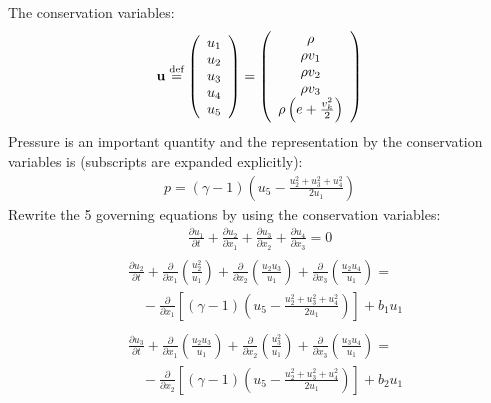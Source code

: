 \documentclass{turgon}
\begin{document}
The conservation variables:
%
\begin{align}
  \mathbf{u} \defeq \left(
  \begin{array}{c}
    u_1 \\ u_2 \\ u_3 \\ u_4 \\ u_5
  \end{array}\right) = \left(
  \begin{array}{c}
    \rho \\ \rho v_1 \\ \rho v_2 \\ \rho v_3 \\
    \rho\left(e+\frac{v_k^2}{2}\right)
  \end{array}\right)
  \label{e:euler:unknown}
\end{align}
%
Pressure is an important quantity and the representation by the conservation
variables is (subscripts are expanded explicitly):
\begin{align*}
  p = (\gamma-1)\left(u_5 - \frac{u_2^2+u_3^2+u_4^2}{2u_1}\right)
\end{align*}
%
Rewrite the 5 governing equations by using the conservation variables:
%
\begin{align}
  \frac{\partial u_1}{\partial t}
  + \frac{\partial u_2}{\partial x_1}
  + \frac{\partial u_3}{\partial x_2}
  + \frac{\partial u_4}{\partial x_3} = 0
  \label{e:euler:gov1}
\end{align}
%
\begin{align}
  \begin{aligned} &\frac{\partial u_2}{\partial t}
  + \frac{\partial}{\partial x_1}\left(\frac{u_2^2}{u_1}\right)
  + \frac{\partial}{\partial x_2}\left(\frac{u_2u_3}{u_1}\right)
  + \frac{\partial}{\partial x_3}\left(\frac{u_2u_4}{u_1}\right) = \\
  &\quad -\frac{\partial}{\partial x_1}\left[
    (\gamma-1)\left(u_5 - \frac{u_2^2+u_3^2+u_4^2}{2u_1}\right)
    \right] + b_1u_1
  \end{aligned}
  \label{e:euler:gov2}
\end{align}
%
\begin{align}
  \begin{aligned} &\frac{\partial u_3}{\partial t}
  + \frac{\partial}{\partial x_1}\left(\frac{u_2u_3}{u_1}\right)
  + \frac{\partial}{\partial x_2}\left(\frac{u_3^2}{u_1}\right)
  + \frac{\partial}{\partial x_3}\left(\frac{u_3u_4}{u_1}\right) = \\
  &\quad -\frac{\partial}{\partial x_2}\left[
    (\gamma-1)\left(u_5 - \frac{u_2^2+u_3^2+u_4^2}{2u_1}\right)
    \right] + b_2u_1
  \end{aligned}
  \label{e:euler:gov3}
\end{align}
\end{document}

